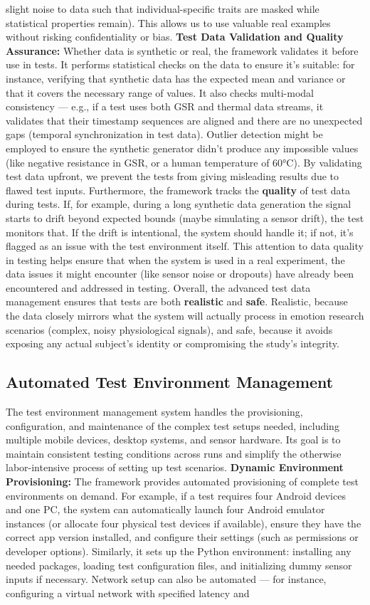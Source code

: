 slight noise to data such that individual-specific traits are masked while statistical properties remain). This allows us to use valuable real examples without risking confidentiality or bias. \textbf{Test Data Validation and Quality Assurance:} Whether data is synthetic or real, the framework validates it before use in tests. It performs statistical checks on the data to ensure it's suitable: for instance, verifying that synthetic data has the expected mean and variance or that it covers the necessary range of values. It also checks multi-modal consistency --- e.g., if a test uses both GSR and thermal data streams, it validates that their timestamp sequences are aligned and there are no unexpected gaps (temporal synchronization in test data). Outlier detection might be employed to ensure the synthetic generator didn't produce any impossible values (like negative resistance in GSR, or a human temperature of 60°C). By validating test data upfront, we prevent the tests from giving misleading results due to flawed test inputs. Furthermore, the framework tracks the \textbf{quality} of test data during tests. If, for example, during a long synthetic data generation the signal starts to drift beyond expected bounds (maybe simulating a sensor drift), the test monitors that. If the drift is intentional, the system should handle it; if not, it's flagged as an issue with the test environment itself. This attention to data quality in testing helps ensure that when the system is used in a real experiment, the data issues it might encounter (like sensor noise or dropouts) have already been encountered and addressed in testing. Overall, the advanced test data management ensures that tests are both \textbf{realistic} and \textbf{safe}. Realistic, because the data closely mirrors what the system will actually process in emotion research scenarios (complex, noisy physiological signals), and safe, because it avoids exposing any actual subject's identity or compromising the study's integrity. \subsection{Automated Test Environment Management} The test environment management system handles the provisioning, configuration, and maintenance of the complex test setups needed, including multiple mobile devices, desktop systems, and sensor hardware. Its goal is to maintain consistent testing conditions across runs and simplify the otherwise labor-intensive process of setting up test scenarios. \textbf{Dynamic Environment Provisioning:} The framework provides automated provisioning of complete test environments on demand. For example, if a test requires four Android devices and one PC, the system can automatically launch four Android emulator instances (or allocate four physical test devices if available), ensure they have the correct app version installed, and configure their settings (such as permissions or developer options). Similarly, it sets up the Python environment: installing any needed packages, loading test configuration files, and initializing dummy sensor inputs if necessary. Network setup can also be automated --- for instance, configuring a virtual network with specified latency and 